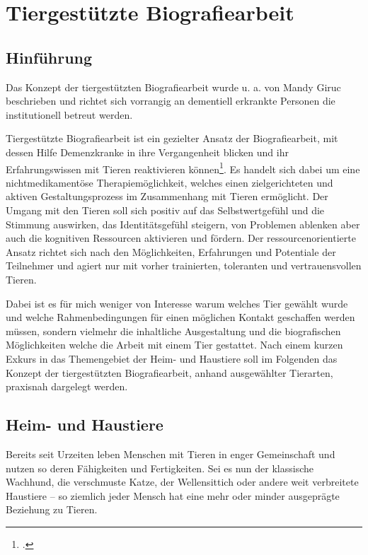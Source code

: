 \section{Tiergestützte Biografiearbeit}
\label{sec:k4_TiergestützteBiografiearbeit}

\subsection{Hinführung}
\label{sec:k4.1_Hinführung}

Das Konzept der tiergestützten Biografiearbeit wurde u. a. von Mandy Giruc beschrieben und richtet sich vorrangig an dementiell erkrankte Personen die institutionell betreut werden.

Tiergestützte Biografiearbeit ist ein gezielter Ansatz der Biografiearbeit, mit dessen Hilfe Demenzkranke in ihre Vergangenheit blicken und ihr Erfahrungswissen mit Tieren reaktivieren können\footcite[vgl.][32f]{Giruc2011}. Es handelt sich dabei um eine nichtmedikamentöse Therapiemöglichkeit, welches einen zielgerichteten und aktiven Gestaltungsprozess im Zusammenhang mit Tieren ermöglicht. Der Umgang mit den Tieren soll sich positiv auf das Selbstwertgefühl und die Stimmung auswirken, das Identitätsgefühl steigern, von Problemen ablenken aber auch die kognitiven Ressourcen aktivieren und fördern. Der ressourcenorientierte Ansatz richtet sich nach den Möglichkeiten, Erfahrungen und Potentiale der Teilnehmer und agiert nur mit vorher trainierten, toleranten und vertrauensvollen Tieren. 

Dabei ist es für mich weniger von Interesse warum welches Tier gewählt wurde und welche Rahmenbedingungen für einen möglichen Kontakt geschaffen werden müssen, sondern vielmehr die inhaltliche Ausgestaltung und die biografischen Möglichkeiten welche die Arbeit mit einem Tier gestattet. Nach einem kurzen Exkurs in das Themengebiet der Heim- und Haustiere soll im Folgenden das Konzept der tiergestützten Biografiearbeit, anhand ausgewählter Tierarten, praxisnah dargelegt werden. 

\subsection{Heim- und Haustiere}
\label{sec:k4.2_HeimUndHaustiere}

Bereits seit Urzeiten leben Menschen mit Tieren in enger Gemeinschaft und nutzen so deren Fähigkeiten und Fertigkeiten. Sei es nun der klassische Wachhund, die verschmuste Katze, der Wellensittich oder andere weit verbreitete Haustiere -- so ziemlich jeder Mensch hat eine mehr oder minder ausgeprägte Beziehung zu Tieren. 

